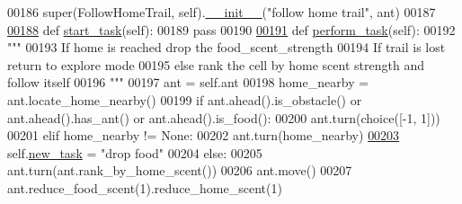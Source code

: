 \begin{DoxyCode}
00186         super(FollowHomeTrail, self).\hyperlink{classtask__manager_1_1FollowHomeTrail_a644c02e687f8a412a39e81628742f3b5}{\_\_init\_\_}(\textcolor{stringliteral}{"follow home trail"}, ant)
00187 
\hypertarget{task__manager_8py_source_l00188}{}\hyperlink{classtask__manager_1_1FollowHomeTrail_a0ffd4aabfafcfead05a02e149e5fab91}{00188}     \textcolor{keyword}{def }\hyperlink{classtask__manager_1_1FollowHomeTrail_a0ffd4aabfafcfead05a02e149e5fab91}{start\_task}(self):
00189         \textcolor{keywordflow}{pass}
00190 
\hypertarget{task__manager_8py_source_l00191}{}\hyperlink{classtask__manager_1_1FollowHomeTrail_ae4386ef7470e20e3f42fab9fc65b70cb}{00191}     \textcolor{keyword}{def }\hyperlink{classtask__manager_1_1FollowHomeTrail_ae4386ef7470e20e3f42fab9fc65b70cb}{perform\_task}(self):
00192         \textcolor{stringliteral}{"""}
00193 \textcolor{stringliteral}{            If home is reached drop the food\_scent\_strength}
00194 \textcolor{stringliteral}{            If trail is lost return to explore mode}
00195 \textcolor{stringliteral}{            else rank the cell by home scent strength and follow itself}
00196 \textcolor{stringliteral}{        """}
00197         ant = self.ant
00198         home\_nearby = ant.locate\_home\_nearby()
00199         \textcolor{keywordflow}{if} ant.ahead().is\_obstacle() \textcolor{keywordflow}{or} ant.ahead().has\_ant() \textcolor{keywordflow}{or} ant.ahead().is\_food():
00200             ant.turn(choice([-1, 1]))
00201         \textcolor{keywordflow}{elif} home\_nearby != \textcolor{keywordtype}{None}:
00202             ant.turn(home\_nearby)
\hypertarget{task__manager_8py_source_l00203}{}\hyperlink{classtask__manager_1_1FollowHomeTrail_aae7878e14c1b1aeeac617e2e03074705}{00203}             self.\hyperlink{classtask__manager_1_1Task_af16658f4c3c447e24f73ed3d1803e058}{new\_task} = \textcolor{stringliteral}{"drop food"}
00204         \textcolor{keywordflow}{else}:
00205             ant.turn(ant.rank\_by\_home\_scent())
00206             ant.move()
00207         ant.reduce\_food\_scent(1).reduce\_home\_scent(1)
\end{DoxyCode}
